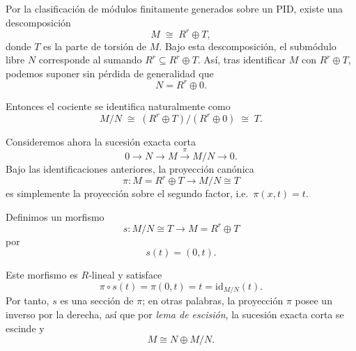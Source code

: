 \begin{sol}
Por la clasificación de módulos finitamente generados sobre un PID, existe una descomposición
\[
M \;\cong\; R^r \oplus T,
\]
donde $T$ es la parte de torsión de $M$. Bajo esta descomposición, el submódulo libre $N$ 
corresponde al sumando $R^r \subseteq R^r \oplus T$. Así, tras identificar $M$ con 
$R^r \oplus T$, podemos suponer sin pérdida de generalidad que
\[
N = R^r \oplus 0.
\]

Entonces el cociente se identifica naturalmente como
\[
M/N \;\cong\; (R^r \oplus T)/(R^r \oplus 0)
   \;\cong\; T.
\]

Consideremos ahora la sucesión exacta corta
\[
0 \longrightarrow N \longrightarrow M \xrightarrow{\pi} M/N \longrightarrow 0.
\]
Bajo las identificaciones anteriores, la proyección canónica
\[
\pi \colon M = R^r \oplus T \longrightarrow M/N \cong T
\]
es simplemente la proyección sobre el segundo factor, i.e.\ $\pi(x,t)=t$.

Definimos un morfismo
\[
s \colon M/N \cong T \longrightarrow M = R^r \oplus T
\]
por
\[
s(t) = (0,t).
\]

Este morfismo es $R$-lineal y satisface
\[
\pi \circ s(t) = \pi(0,t) = t = \mathrm{id}_{M/N}(t).
\]
Por tanto, $s$ es una sección de $\pi$; en otras palabras, la proyección 
$\pi$ posee un inverso por la derecha, así que por \emph{lema de escisión}, la sucesión exacta corta se escinde y
\[
M \cong N \oplus M/N.
\]
\end{sol}


